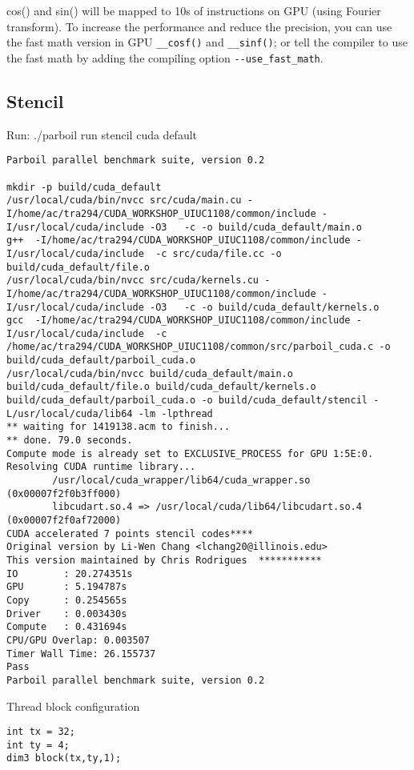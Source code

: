 cos() and sin() will be mapped to 10s of instructions on GPU (using
Fourier transform). To increase the performance and reduce the
precision, you can use the fast math version in GPU \verb!__cosf()!
and \verb!__sinf()!; or tell the compiler to use the fast math by
adding the compiling option \verb!--use_fast_math!.

\subsection{Stencil}
\label{sec:stencil}


Run:  ./parboil run stencil cuda default
\begin{verbatim}
Parboil parallel benchmark suite, version 0.2

mkdir -p build/cuda_default
/usr/local/cuda/bin/nvcc src/cuda/main.cu -I/home/ac/tra294/CUDA_WORKSHOP_UIUC1108/common/include -I/usr/local/cuda/include -O3   -c -o build/cuda_default/main.o
g++  -I/home/ac/tra294/CUDA_WORKSHOP_UIUC1108/common/include -I/usr/local/cuda/include  -c src/cuda/file.cc -o build/cuda_default/file.o
/usr/local/cuda/bin/nvcc src/cuda/kernels.cu -I/home/ac/tra294/CUDA_WORKSHOP_UIUC1108/common/include -I/usr/local/cuda/include -O3   -c -o build/cuda_default/kernels.o
gcc  -I/home/ac/tra294/CUDA_WORKSHOP_UIUC1108/common/include -I/usr/local/cuda/include  -c /home/ac/tra294/CUDA_WORKSHOP_UIUC1108/common/src/parboil_cuda.c -o build/cuda_default/parboil_cuda.o
/usr/local/cuda/bin/nvcc build/cuda_default/main.o build/cuda_default/file.o build/cuda_default/kernels.o build/cuda_default/parboil_cuda.o -o build/cuda_default/stencil -L/usr/local/cuda/lib64 -lm -lpthread 
** waiting for 1419138.acm to finish...
** done. 79.0 seconds.
Compute mode is already set to EXCLUSIVE_PROCESS for GPU 1:5E:0.
Resolving CUDA runtime library...
        /usr/local/cuda_wrapper/lib64/cuda_wrapper.so (0x00007f2f0b3ff000)
        libcudart.so.4 => /usr/local/cuda/lib64/libcudart.so.4 (0x00007f2f0af72000)
CUDA accelerated 7 points stencil codes****
Original version by Li-Wen Chang <lchang20@illinois.edu>
This version maintained by Chris Rodrigues  ***********
IO        : 20.274351s
GPU       : 5.194787s
Copy      : 0.254565s
Driver    : 0.003430s
Compute   : 0.431694s
CPU/GPU Overlap: 0.003507
Timer Wall Time: 26.155737
Pass
Parboil parallel benchmark suite, version 0.2
\end{verbatim}

Thread block configuration
\begin{lstlisting}
int tx = 32;
int ty = 4;
dim3 block(tx,ty,1);
\end{lstlisting}

